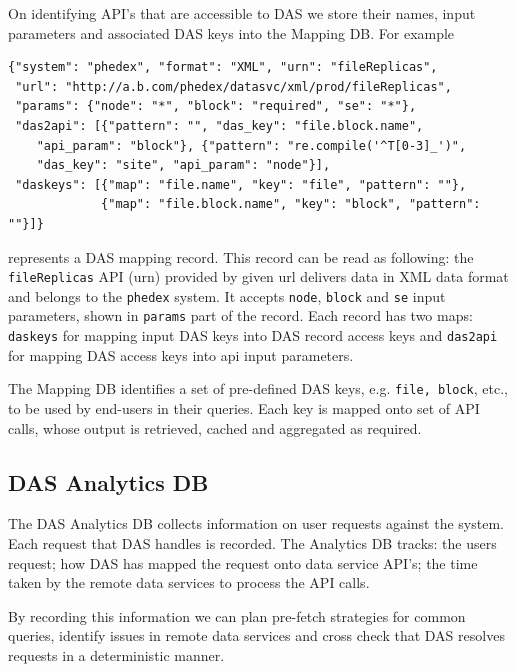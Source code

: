 \documentclass[3p,times]{elsarticle}
\begin{document}
On identifying API's that are accessible to DAS we store
their names, input parameters and associated DAS keys
into the Mapping DB. For example
\begin{verbatim}
{"system": "phedex", "format": "XML", "urn": "fileReplicas",
 "url": "http://a.b.com/phedex/datasvc/xml/prod/fileReplicas", 
 "params": {"node": "*", "block": "required", "se": "*"}, 
 "das2api": [{"pattern": "", "das_key": "file.block.name", 
    "api_param": "block"}, {"pattern": "re.compile('^T[0-3]_')", 
    "das_key": "site", "api_param": "node"}], 
 "daskeys": [{"map": "file.name", "key": "file", "pattern": ""}, 
             {"map": "file.block.name", "key": "block", "pattern": ""}]}
\end{verbatim}
represents a DAS mapping record.
This record can be read as following:
the \verb+fileReplicas+ API (urn) provided by given url delivers data in
XML data format and belongs to the \verb+phedex+ system.
It accepts \verb+node+, \verb+block+ and \verb+se+ input parameters, shown in \verb+params+ part
of the record. Each record has two maps: 
\verb+daskeys+ for mapping input DAS keys into DAS record access keys and
\verb+das2api+ for mapping DAS access keys into api input parameters.

The Mapping DB identifies a set of pre-defined DAS keys, 
e.g. \verb+file, block+, etc., to be used by end-users in their queries.
Each key is mapped onto set of API calls, whose output is retrieved,
cached and aggregated as required. 

\subsection{DAS Analytics DB}
The DAS Analytics DB collects information on user requests against the system.
Each request that DAS handles is recorded.
The Analytics DB tracks: the users request; how DAS has mapped the request 
onto data service API's; the time taken by the remote data services to 
process the API calls.

By recording this information we can plan pre-fetch strategies for common queries,
identify issues in remote data services and cross check that DAS resolves requests
in a deterministic manner.

\end{document}
